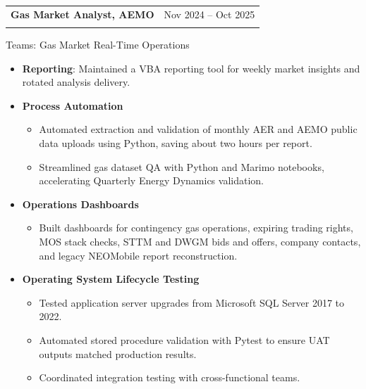 \documentclass[10pt,a4paper]{article}
\makeatletter
\newenvironment{resumejob}[3]{
  \par\addvspace{0.45em}
  \noindent\begin{tabularx}{\textwidth}{@{}>{\raggedright\arraybackslash}X>{\raggedleft\arraybackslash}p{0.3\textwidth}@{}}
    \textbf{\textcolor{textdark}{#1}} & \textcolor{mutedtext}{#2} \\
    \multicolumn{2}{@{}l@{}}{\textit{\textcolor{mutedtext}{#3}}}
  \end{tabularx}
  \vspace{-0.55em}
}{
  \par\addvspace{0.2em}
}
\makeatother
\begin{document}
\begin{resumejob}{Gas Market Analyst, AEMO}{Nov 2024 -- Oct 2025}{Melbourne}
Teams: Gas Market Real-Time Operations
\begin{itemize}
  \item \textbf{Reporting}: Maintained a VBA reporting tool for weekly market insights and rotated analysis delivery.
  \item \textbf{Process Automation}
  \begin{itemize}
    \item Automated extraction and validation of monthly AER and AEMO public data uploads using Python, saving about two hours per report.
    \item Streamlined gas dataset QA with Python and Marimo notebooks, accelerating Quarterly Energy Dynamics validation.
  \end{itemize}
  \item \textbf{Operations Dashboards}
  \begin{itemize}
    \item Built dashboards for contingency gas operations, expiring trading rights, MOS stack checks, STTM and DWGM bids and offers, company contacts, and legacy NEOMobile report reconstruction.
  \end{itemize}
  \item \textbf{Operating System Lifecycle Testing}
  \begin{itemize}
    \item Tested application server upgrades from Microsoft SQL Server 2017 to 2022.
    \item Automated stored procedure validation with Pytest to ensure UAT outputs matched production results.
    \item Coordinated integration testing with cross-functional teams.
  \end{itemize}
\end{itemize}
\end{resumejob}
\end{document}
